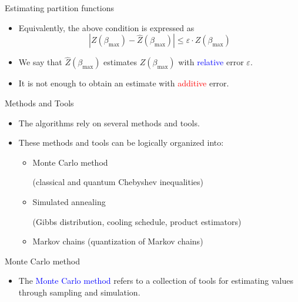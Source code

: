 \documentclass{beamer}
\renewcommand{\>}{\rangle}
\newcommand{\<}{\langle}
\begin{document}
\begin{frame}{Estimating partition functions}

\begin{itemize}
    \item 
    Equivalently, the above condition is expressed as
    \begin{equation*}
        | Z(\beta_{\max}) - \hat{Z}(\beta_{\max}) | \le
        \varepsilon \cdot Z(\beta_{\max})
    \end{equation*}
    
    \medskip
    \item We say that $\hat{Z}(\beta_{\max})$ estimates $Z(\beta_{\max})$ with \textcolor{blue}{relative} error $\varepsilon$.
    
    \bigskip
    \item It is not enough to obtain an estimate with \textcolor{red}{additive} error.
\end{itemize}

\end{frame}

%

\begin{frame}{Methods and Tools}

\begin{itemize}
\item The algorithms rely on several methods and tools. 

\medskip
\item These methods and tools can be logically organized into:

\medskip
\begin{itemize}
    \item Monte Carlo method 
    
    (classical and quantum Chebyshev inequalities)

    \medskip
    \item Simulated annealing 
    
    (Gibbs distribution, cooling schedule, product estimators)

    \medskip
    \item Markov chains 
    (quantization of Markov chains)
    
\end{itemize}
\end{itemize}
\end{frame}

%

\begin{frame}{Monte Carlo method}
    \begin{itemize}
        \item The \textcolor{blue}{Monte Carlo method} refers to a collection of tools for estimating values through sampling and simulation.

    \end{itemize}
\end{frame}
\end{document}
